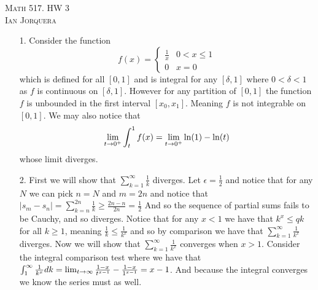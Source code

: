 \documentclass[12pt]{amsart}
\begin{document}
\begin{center}
   \textsc{Math 517. HW 3\\ Ian Jorquera}
\end{center}
\vspace{1em}

\begin{itemize}
   \item[1.]
      Consider the function
      \[ f(x)= \begin{cases}
            \frac{1}{x} & 0<x\leq 1 \\
            0           & x=0
         \end{cases}\]
      which is defined for all $[0,1]$ and is integral for any $[\delta,1]$ where
      $0<\delta<1$ as $f$ is continuous on $[\delta,1]$. However for any partition of
      $[0,1]$ the function $f$ is unbounded in the first interval $[x_0,x_1]$.
      Meaning $f$ is not integrable on $[0,1]$. We may also notice that
      \[\lim_{t\rightarrow 0^+}\int_{t}^1f(x)=\lim_{t\rightarrow 0^+}\ln(1)-\ln(t)\]
      whose limit diverges.

   \item[2.] First we will show that $\sum_{k=1}^\infty\frac{1}{k}$ diverges.
      Let $\epsilon=\frac{1}{2}$
      and notice that for any $N$ we can pick $n=N$ and $m=2n$ and notice that $|s_m-s_n|=\sum_{k=n}^{2n}\frac{1}{k}\geq \frac{2n-n}{2n}=\frac{1}{2}$
      And so the sequence of partial sums fails to be Cauchy, and so diverges.
      Notice that for any $x<1$ we have that $k^x\leq q k$ for all $k\geq 1$, meaning $\frac{1}{k} \leq \frac{1}{k^x}$
      and so by comparison we have that $\sum_{k=1}^\infty\frac{1}{k^x}$ diverges.
      Now we will show that $\sum_{k=1}^\infty\frac{1}{k^x}$ converges when $x>1$.
      Consider the integral comparison test where we have that $\int_1^\infty\frac{1}{k^x}dk=\lim_{t\rightarrow \infty}\frac{1-x}{t^{x-1}}-\frac{1-x}{1^{x-1}}=x-1$.
      And because the integral converges we know the series must as well.


\end{itemize}
\end{document}
